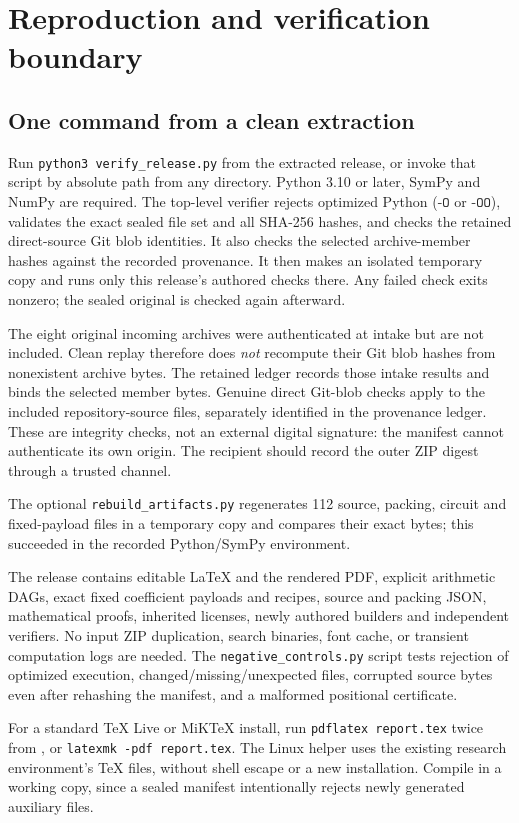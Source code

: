 \section{Reproduction and verification boundary}
\subsection{One command from a clean extraction}
Run \texttt{python3 verify\_release.py} from the extracted release, or invoke
that script by absolute path from any directory. Python 3.10 or later,
SymPy and NumPy are required. The top-level verifier rejects optimized
Python ($\texttt{-O}$ or $\texttt{-OO}$), validates the exact sealed file
set and all SHA-256 hashes, and checks the retained direct-source Git blob
identities. It also checks the selected archive-member hashes against the
recorded provenance. It then makes an isolated temporary copy and runs
only this release's authored checks there. Any failed check exits nonzero;
the sealed original is checked again afterward.

The eight original incoming archives were authenticated at intake but are
not included. Clean replay therefore does \emph{not} recompute their Git
blob hashes from nonexistent archive bytes. The retained ledger records
those intake results and binds the selected member bytes. Genuine direct
Git-blob checks apply to the included repository-source files, separately
identified in the provenance ledger. These are integrity checks, not an
external digital signature: the manifest cannot authenticate its own origin.
The recipient should record the outer ZIP digest through a trusted channel.

The optional \texttt{rebuild\_artifacts.py} regenerates 112 source, packing,
circuit and fixed-payload files in a temporary copy and compares their exact
bytes; this succeeded in the recorded Python/SymPy environment.

The release contains editable \LaTeX{} and the rendered PDF, explicit
arithmetic DAGs, exact fixed coefficient payloads and recipes, source and
packing JSON, mathematical proofs, inherited licenses, newly authored
builders and independent verifiers. No input ZIP duplication, search
binaries, font cache, or transient computation logs are needed.
The \texttt{negative\_controls.py} script tests rejection of optimized
execution, changed/missing/unexpected files, corrupted source bytes even
after rehashing the manifest, and a malformed positional certificate.

For a standard TeX Live or MiKTeX install, run \texttt{pdflatex report.tex}
twice from , or \texttt{latexmk -pdf report.tex}.
The Linux helper uses the existing research environment's TeX files, without
shell escape or a new installation. Compile in a working copy, since a
sealed manifest intentionally rejects newly generated auxiliary files.

